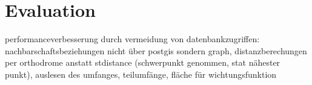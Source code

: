 \section{Evaluation}

performanceverbesserung durch vermeidung von datenbankzugriffen: nachbarschaftsbeziehungen nicht über postgis sondern graph, distanzberechungen per orthodrome anstatt stdistance (schwerpunkt genommen, stat nähester punkt), auslesen des umfanges, teilumfänge, fläche für wichtungsfunktion